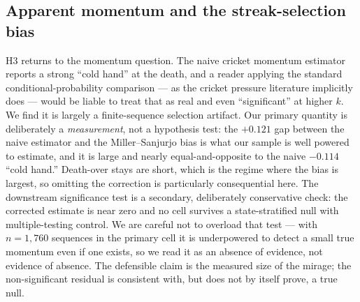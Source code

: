 \subsection{Apparent momentum and the streak-selection bias}
H3 returns to the momentum question. The naive cricket momentum estimator reports a
strong ``cold hand'' at the death, and a reader applying the standard
conditional-probability comparison --- as the cricket pressure literature
implicitly does --- would be liable to treat that as real and even ``significant''
at higher $k$. We find it is largely a finite-sequence selection artifact. Our primary quantity
is deliberately a \emph{measurement}, not a hypothesis test: the $+0.121$ gap
between the naive estimator and the Miller--Sanjurjo bias is what our sample is
well powered to estimate, and it is large and nearly equal-and-opposite to the
naive $-0.114$ ``cold hand.'' Death-over stays are short, which is the regime where
the bias is largest, so omitting the correction is particularly consequential here.
The downstream significance test is a secondary, deliberately conservative check:
the corrected estimate is near zero and no cell survives a state-stratified null
with multiple-testing control. We are careful not to overload that test --- with
$n=1{,}760$ sequences in the primary cell it is underpowered to detect a small true
momentum even if one exists, so we read it as an absence of evidence, not evidence
of absence. The defensible claim is the measured size of the mirage; the
non-significant residual is consistent with, but does not by itself prove, a true
null.

